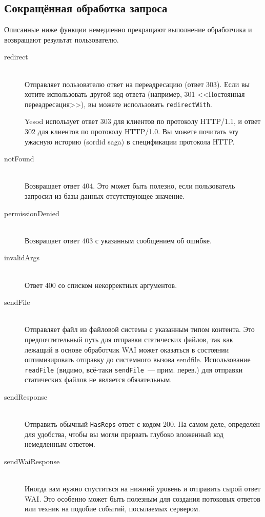 \subsection{Сокращённая обработка запроса}
Описанные ниже функции немедленно прекращают выполнение обработчика и
возвращают результат пользователю.
\begin{description}
\item[redirect] \hfill \\
Отправляет пользователю ответ на переадресацию (ответ 303). Если вы
хотите использовать другой код ответа (например, 301 <<Постоянная
переадресация>>), вы можете использовать \lstinline!redirectWith!.
\begin{remark}
Yesod использует ответ 303 для клиентов по протоколу HTTP/1.1, и ответ
302 для клиентов по протоколу HTTP/1.0. Вы можете почитать эту
ужасную историю (sordid saga) в спецификации протокола HTTP.
\end{remark}

\item[notFound] \hfill \\
Возвращает ответ 404. Это может быть полезно, если пользователь
запросил из базы данных отсутствующее значение.

\item[permissionDenied] \hfill \\
Возвращает ответ 403 с указанным сообщением об ошибке.

\item[invalidArgs] \hfill \\
Ответ 400 со списком некорректных аргументов.

\item[sendFile] \hfill \\
Отправляет файл из файловой системы с указанным типом контента. Это
предпочтительный путь для отправки статических файлов, так как лежащий
в основе обработчик WAI может оказаться в состоянии оптимизировать
отправку до системного вызова sendfile. Использование
\lstinline!readFile! (видимо, всё-таки \lstinline!sendFile!~---
прим. перев.) для отправки статических файлов не является
обязательным.

\item[sendResponse] \hfill \\
Отправить обычный \lstinline!HasReps! ответ с кодом 200. На самом
деле, определён для удобства, чтобы вы могли прервать глубоко
вложенный код немедленным ответом.

\item[sendWaiResponse] \hfill \\
Иногда вам нужно спуститься на нижний уровень и отправить сырой ответ
WAI. Это особенно может быть полезным для создания потоковых ответов
или техник на подобие событий, посылаемых сервером.
\end{description}

